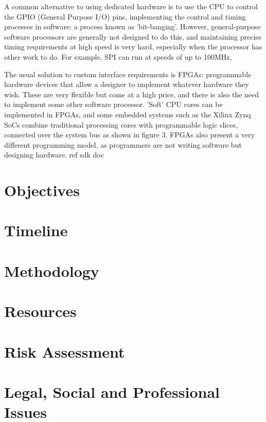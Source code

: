 \documentclass[a4paper,fleqn,12pt]{article}
\begin{document}
A common alternative to using dedicated hardware is to use the CPU to control the GPIO (General Purpose I/O) pins, implementing the control and timing processes in software: a process known as 'bit-banging'. However, general-purpose software processors are generally not designed to do this, and maintaining precise timing requirements at high speed is very hard, especially when the processor has other work to do. For example, SPI can run at speeds of up to 100MHz,

The usual solution to custom interface requirements is FPGAs: programmable hardware devices that allow a designer to implement whatever hardware they wish. These are very flexible but come at a high price, and there is also the need to implement some other software processor. 'Soft' CPU cores can be implemented in FPGAs, and some embedded systems such as the Xilinx Zynq SoCs combine traditional processing cores with programmable logic slices, connected over the system bus as shown in figure 3. FPGAs also present a very different programming model, as programmers are not writing software but designing hardware. ref sdk doc

\section{Objectives}
\section{Timeline}
\section{Methodology}
\section{Resources}
\section{Risk Assessment}
\section{Legal, Social and Professional Issues}


\end{document}
